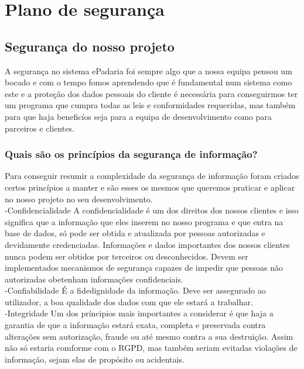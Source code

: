 \chapter{Plano de segurança}
\label{plano_de_segurança}
\section{Segurança do nosso projeto}
A segurança no sistema ePadaria foi sempre algo que a nossa equipa pensou um bocado e com o tempo fomos aprendendo que é fundamental num sistema como este e a proteção dos dados pessoais do cliente é necessária para conseguirmos ter um programa que cumpra todas as leis e conformidades requeridas, mas também para que haja beneficíos seja para a equipa de desenvolvimento como para parceiros e clientes.\\

\subsection{Quais são os princípios da segurança de informação?}
Para conseguir resumir a complexidade da segurança de informação foram criados certos princípios a manter e são esses os mesmos que queremos praticar e aplicar no nosso projeto no seu desenvolvimento.\\
-Confidencialidade
A confidencialidade é um dos direitos dos nossos clientes e isso significa que a informação que eles inserem no nosso programa e que entra na base de dados, só pode ser obtida e atualizada por pessoas autorizadas e devidamente credenciadas. Informações e dados importantes dos nossos clientes nunca podem ser obtidos por terceiros ou desconhecidos.
Devem ser implementados mecanismos de segurança capazes de impedir que pessoas não autorizadas obetenham informações confidenciais.\\

-Confiabilidade
É a fidedignidade da informação. Deve ser assegurado ao utilizador, a boa qualidade dos dados com que ele estará a trabalhar.\\

-Integridade
Um dos príncipios mais importantes a considerar é que haja a garantia de que a informação estará exata, completa e preservada contra alterações sem autorização, fraude ou até mesmo contra a sua destruição.
Assim não só estaria comforme com o RGPD, mas também seriam evitadas violações de informação, sejam elas de propósito ou acidentais.\\

